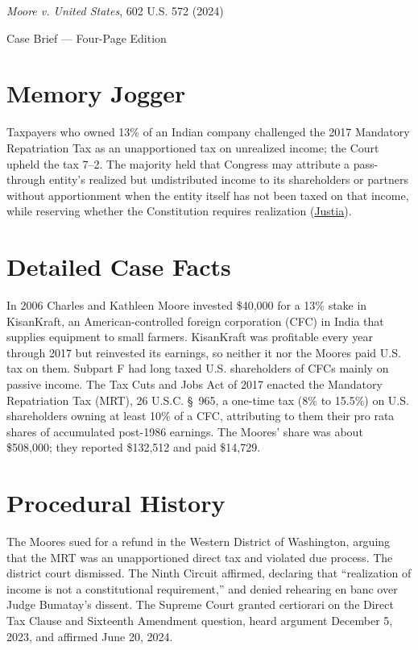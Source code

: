 \documentclass[12pt]{article}
\begin{document}
\begin{center}
{\LARGE \textit{Moore v. United States}, 602 U.S. 572 (2024)\par}
\vspace{0.8em}
{\large Case Brief --- Four-Page Edition\par}
\end{center}
\vspace{1em}

\section{Memory Jogger}

Taxpayers who owned 13\% of an Indian company challenged the 2017 Mandatory Repatriation Tax as an unapportioned tax on unrealized income; the Court upheld the tax 7--2. The majority held that Congress may attribute a pass-through entity's realized but undistributed income to its shareholders or partners without apportionment when the entity itself has not been taxed on that income, while reserving whether the Constitution requires realization (\href{https://supreme.justia.com/cases/federal/us/602/22-800/}{Justia}).

\section{Detailed Case Facts}

In 2006 Charles and Kathleen Moore invested \$40,000 for a 13\% stake in KisanKraft, an American-controlled foreign corporation (CFC) in India that supplies equipment to small farmers. KisanKraft was profitable every year through 2017 but reinvested its earnings, so neither it nor the Moores paid U.S. tax on them. Subpart F had long taxed U.S. shareholders of CFCs mainly on passive income. The Tax Cuts and Jobs Act of 2017 enacted the Mandatory Repatriation Tax (MRT), 26 U.S.C. \S\ 965, a one-time tax (8\% to 15.5\%) on U.S. shareholders owning at least 10\% of a CFC, attributing to them their pro rata shares of accumulated post-1986 earnings. The Moores' share was about \$508,000; they reported \$132,512 and paid \$14,729.

\section{Procedural History}

The Moores sued for a refund in the Western District of Washington, arguing that the MRT was an unapportioned direct tax and violated due process. The district court dismissed. The Ninth Circuit affirmed, declaring that ``realization of income is not a constitutional requirement,'' and denied rehearing en banc over Judge Bumatay's dissent. The Supreme Court granted certiorari on the Direct Tax Clause and Sixteenth Amendment question, heard argument December 5, 2023, and affirmed June 20, 2024.
\end{document}
